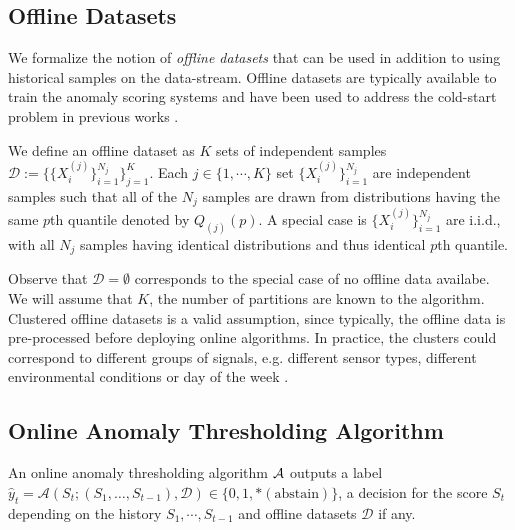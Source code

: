 \subsection{Offline Datasets}
\label{subsec:offline_datasets}

We formalize the notion of \emph{offline datasets} that can be used in addition to using historical samples on the data-stream. Offline datasets are typically available to train the anomaly scoring systems \cite{bhatia2022memstream, audibert2020usad} and have been used to address the cold-start problem in previous works \cite{gutflaish2019temporal,hofmann1999probabilistic}.


 \begin{definition} We define an offline dataset as $K$ sets of independent samples $\mathcal{D} := \{\{X_i^{(j)}\}_{i=1}^{N_j} \}_{j=1}^K$. Each $j \in \{1,\cdots,K\}$ set $\{X_i^{(j)}\}_{i=1}^{N_j}$  are independent samples such that all of the $N_j$ samples are drawn from distributions having the same $p$th quantile denoted by $Q_{(j)}(p)$. A special case is $\{X_i^{(j)}\}_{i=1}^{N_j}$ are i.i.d., with all $N_j$ samples having identical distributions and thus identical $p$th quantile.
 \label{definition:offline_dataset}
 \end{definition}

Observe that $\mathcal{D} = \emptyset$ corresponds to the special case of no offline data availabe.
We will assume that $K$, the number of partitions are known to the algorithm. Clustered offline datasets is a valid assumption, since typically, the offline data is pre-processed before deploying online algorithms. In practice, the clusters could correspond to different groups of signals, e.g. different sensor types, different environmental conditions or day of the week \cite{khan2020industrial, audibert2020usad, sadik2014research}. 

\subsection{Online Anomaly Thresholding Algorithm}
\label{subsec:oad_algo_defn}
 
\begin{definition} An online anomaly thresholding algorithm ${\mathcal{A}}$ outputs a label  $\hat{y}_t = \mathcal{A} (S_t; (S_1, \ldots,S_{t-1}), \mathcal{D})\in \{0,1,* (\text{abstain})\}$, a decision for the score $S_t$ depending on the history $S_1, \cdots, S_{t-1}$ and offline datasets $\mathcal{D}$ if any. 
\label{def:algo}
\end{definition}

